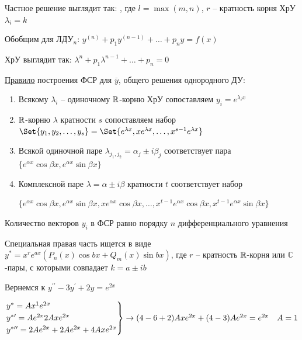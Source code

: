 \documentclass[12pt]{article}
\begin{document}
\begin{enumerate}
    Частное решение выглядит так: , где $l = \max(m, n)$, $r$ -- кратность корня ХрУ $\lambda_i = k$

    \smallvspace

    Обобщим для ЛДУ$_n$: $y^{(n)} + p_1 y^{(n - 1)} + \dots + p_n y = f(x)$

    ХрУ выглядит так: $\lambda^n + p_1 \lambda^{n - 1} + \dots + p_n = 0$

    \mediumvspace

    \hypertarget{fssforlde2}{}

    \underline{Правило} построения ФСР для $\overline{y}$, общего решения однородного ДУ:

    \begin{enumerate}
        \item Всякому $\lambda_i$ -- одиночному $\mathbb{R}$-корню ХрУ сопоставляем $y_i = e^{\lambda_i x}$

        \item $\mathbb{R}$-корню $\lambda$ кратности $s$ сопоставляем набор $\Set{y_1, y_2, \dots, y_s} = \Set{e^{\lambda x}, xe^{\lambda x}, \dots, x^{s - 1} e^{\lambda x}}$

        \item Всякой одиночной паре $\lambda_{j_1,j_2} = \alpha_j \pm i\beta_j$ соответствует пара $\{e^{\alpha x} \cos\beta x, e^{\alpha x} \sin\beta x\}$

        \item Комплексной паре $\lambda = \alpha \pm i\beta$ кратности $t$ соответствует набор 
        
        $\{e^{\alpha x} \cos \beta x, e^{\alpha x} \sin \beta x, x e^{\alpha x} \cos \beta x, \dots, x^{t - 1}e^{\alpha x} \cos\beta x, x^{t - 1}e^{\alpha x} \sin\beta x\}$
    \end{enumerate}

    \Nota Количество векторов $y_i$ в ФСР равно порядку $n$ дифференциального уравнения

    Специальная правая часть ищется в виде $y^* = x^r e^{ax} (P_n(x)\cos bx + Q_m (x)\sin bx)$, где $r$ -- кратность $\mathbb{R}$-корня или $\mathbb{C}$-пары, с которыми совпадает $k = a \pm ib$

    \Ex Вернемся к $y^{\prime\prime} - 3y^\prime + 2y = e^{2x}$

    $\begin{rcases*}
    y^* = Ax^1 e^{2x} \\
    y^{*\prime} = Ae^{2x} 2Axe^{2x} \\
    y^{*\prime\prime} = 2Ae^{2x} + 2Ae^{2x} + 4Axe^{2x}
    \end{rcases*} \to (4 - 6 + 2) Axe^{2x} + (4 - 3) Ae^{2x} = e^{2x} \quad A = 1$


\end{enumerate}
\end{document}

